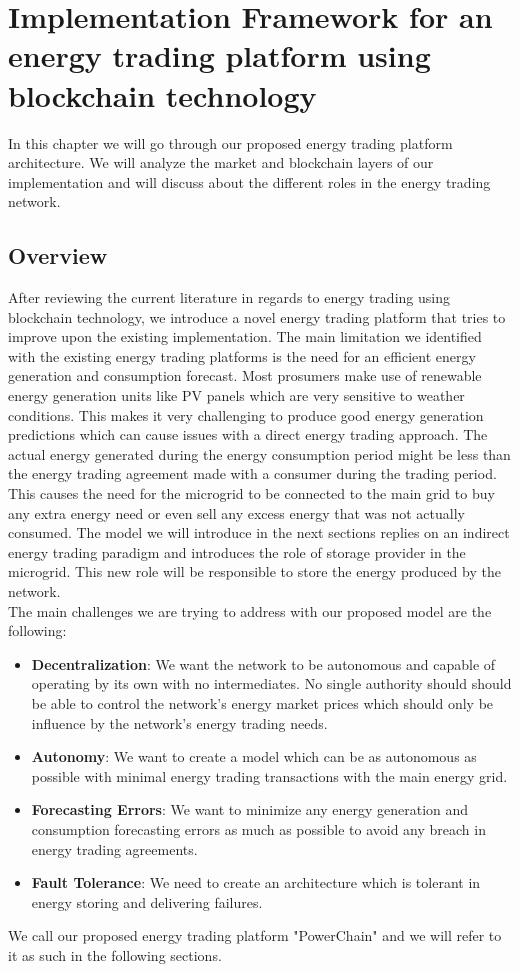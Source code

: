 \chapter{Implementation Framework for an energy trading platform using blockchain technology} \label{framework}

In this chapter we will go through our proposed energy trading platform architecture. We will analyze the market and blockchain layers of our implementation and will
discuss about the different roles in the energy trading network.

\section{Overview}
After reviewing the current literature in regards to energy trading using blockchain technology, we introduce a novel energy trading platform that tries
to improve upon the existing implementation. The main limitation we identified with the existing energy trading platforms is the need for an efficient energy
generation and consumption forecast. Most prosumers make use of renewable energy generation units like PV panels which are very sensitive to weather conditions.
This makes it very challenging to produce good energy generation predictions which can cause issues with a direct energy trading approach. The actual energy
generated during the energy consumption period might be less than the energy trading agreement made with a consumer during the trading period. This causes the need
for the microgrid to be connected to the main grid to buy any extra energy need or even sell any excess energy that was not actually consumed.
The model we will introduce in the next sections replies on an indirect energy trading paradigm and introduces the role of storage provider in the microgrid.
This new role will be responsible to store the energy produced by the network.\\
The main challenges we are trying to address with our proposed model are the following:
\begin{itemize}
    \item \textbf{Decentralization}: We want the network to be autonomous and capable of operating by its own with no intermediates. No single authority should
          should be able to control the network's energy market prices which should only be influence by the network's energy trading needs.
    \item \textbf{Autonomy}: We want to create a model which can be as autonomous as possible with minimal energy trading transactions with the main energy grid.
    \item \textbf{Forecasting Errors}: We want to minimize any energy generation and consumption forecasting errors as much as possible to avoid any breach in energy
          trading agreements.
    \item \textbf{Fault Tolerance}: We need to create an architecture which is tolerant in energy storing and delivering failures.
\end{itemize}
We call our proposed energy trading platform "PowerChain" and we will refer to it as such in the following sections.

